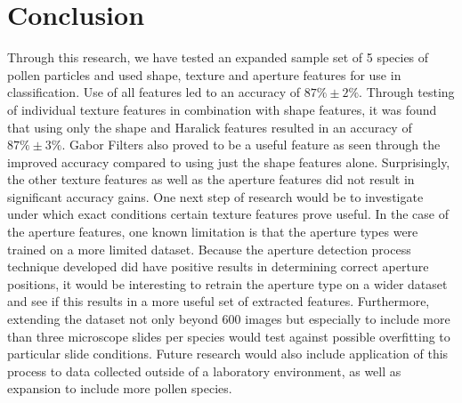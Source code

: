 \section{Conclusion}

Through this research, we have tested an expanded sample set of 5 species of pollen particles and used shape, texture and aperture features for use in classification. Use of all features led to an accuracy of $87\% \pm 2\%$. Through testing of individual texture features in combination with shape features, it was found that using only the shape and Haralick features resulted in an accuracy of $87\% \pm 3\%$. Gabor Filters also proved to be a useful feature as seen through the improved accuracy compared to using just the shape features alone. Surprisingly, the other texture features as well as the aperture features did not result in significant accuracy gains. One next step of research would be to investigate under which exact conditions certain texture features prove useful. In the case of the aperture features, one known limitation is that the aperture types were trained on a more limited dataset. Because the aperture detection process technique developed did have positive results in determining correct aperture positions, it would be interesting to retrain the aperture type on a wider dataset and see if this results in a more useful set of extracted features. Furthermore, extending the dataset not only beyond 600 images but especially to include more than three microscope slides per species would test against possible overfitting to particular slide conditions. Future research would also include application of this process to data collected outside of a laboratory environment, as well as expansion to include more pollen species.
    
  
  
  
  
  